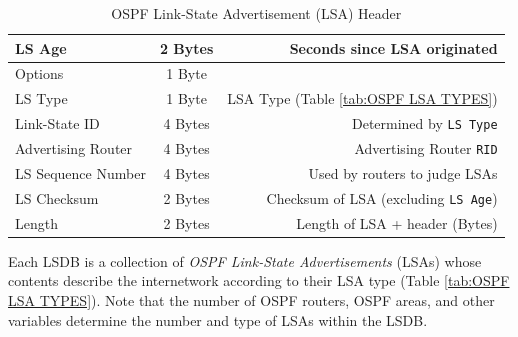 \documentclass[12pt]{article}
\begin{document}
	\begin{table}[H]
	\centering
	\caption{OSPF Link-State Advertisement (LSA) Header \label{tab:OSPF LSA}}
	\begin{tabular}{| l | c | r |}
	\hline
	LS Age			& 2 Bytes	& Seconds since LSA originated\\\hline
	Options			& 1 Byte	&\\\hline
	LS Type			& 1 Byte	& LSA Type (Table \ref{tab:OSPF LSA TYPES})\\\hline
	Link-State ID		& 4 Bytes	& Determined by \texttt{LS Type}\\\hline
	Advertising Router	& 4 Bytes	& Advertising Router \texttt{RID}\\\hline
	LS Sequence Number	& 4 Bytes	& Used by routers to judge LSAs\\\hline
	LS Checksum		& 2 Bytes	& Checksum of LSA (excluding \texttt{LS Age})\\\hline
	Length			& 2 Bytes	& Length of LSA + header (Bytes)\\\hline
	\end{tabular}\end{table}
	Each LSDB is a collection of \textit{OSPF Link-State Advertisements} (LSAs) whose contents describe the internetwork according to their LSA type (Table \ref{tab:OSPF LSA TYPES}). Note that the number of OSPF routers, OSPF areas, and other variables determine the number and type of LSAs within the LSDB.
\end{document}
